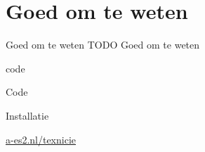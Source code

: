 \documentclass[../presentatie.tex]{subfiles}
\begin{document}
\section{Goed om te weten}

\clearrecentlist
    
\begin{frame}{Goed om te weten}
    TODO Goed om te weten
\end{frame}

\begin{saveblock}{code}
	\begin{highlightblock}[gobble=8,linewidth=0.5\textwidth,framexleftmargin=0.25em]
        Code
	\end{highlightblock}
\end{saveblock}

\begin{frame}
    {Installatie}

    \centering\url{a-es2.nl/texnicie}
\end{frame}
\end{document}

